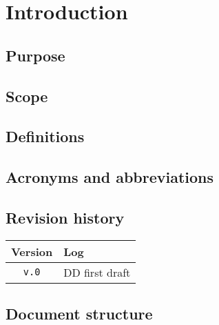 \documentclass[../DD0.tex]{subfiles}
\newcommand{\addRevision}[2]{\texttt{v.#1} & #2 \\ \hline}
\begin{document}
\section{Introduction}
\label{sec:intro}

  \subsection{Purpose}
  \label{sec:purpose}

  \subsection{Scope}
  \label{sec:scope}

  \subsection{Definitions}
  \label{sec:definitions}

  \subsection{Acronyms and abbreviations}
  \label{sec:acronyms}

  \subsection{Revision history}
  \label{sec:revhistory}

    \begin{table}[!h]
      \begin{tabular}{|c|l|}
        \hline
        \textbf{Version}  & \textbf{Log} \\ \hline
        \addRevision{0}{DD first draft}
      \end{tabular}
    \end{table}

  \subsection{Document structure}
  \label{sec:docstructure}
\end{document}
